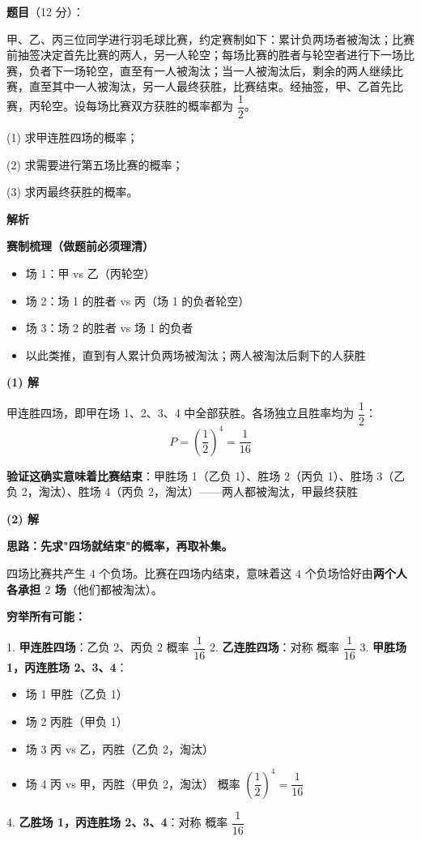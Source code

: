 \begin{answer}

\textbf{题目}（12 分）：

甲、乙、丙三位同学进行羽毛球比赛，约定赛制如下：累计负两场者被淘汰；比赛前抽签决定首先比赛的两人，另一人轮空；每场比赛的胜者与轮空者进行下一场比赛，负者下一场轮空，直至有一人被淘汰；当一人被淘汰后，剩余的两人继续比赛，直至其中一人被淘汰，另一人最终获胜，比赛结束。经抽签，甲、乙首先比赛，丙轮空。设每场比赛双方获胜的概率都为 $\dfrac12$。

  (1) 求甲连胜四场的概率；

  (2) 求需要进行第五场比赛的概率；

  (3) 求丙最终获胜的概率。

\textbf{解析}

\par\medskip

\textbf{赛制梳理（做题前必须理清）}

\begin{itemize}
\item 场 1：甲 vs 乙（丙轮空）
\item 场 2：场 1 的胜者 vs 丙（场 1 的负者轮空）
\item 场 3：场 2 的胜者 vs 场 1 的负者
\item 以此类推，直到有人累计负两场被淘汰；两人被淘汰后剩下的人获胜
\end{itemize}

\par\medskip

\textbf{(1) 解}

甲连胜四场，即甲在场 1、2、3、4 中全部获胜。各场独立且胜率均为 $\dfrac12$：
\nopagebreak[4]
\[P=\left(\frac12\right)^{4}=\frac1{16}\]

\textbf{验证这确实意味着比赛结束}：甲胜场 1（乙负 1）、胜场 2（丙负 1）、胜场 3（乙负 2，淘汰）、胜场 4（丙负 2，淘汰）——两人都被淘汰，甲最终获胜 

\par\medskip

\textbf{(2) 解}

\textbf{思路：先求"四场就结束"的概率，再取补集。}

四场比赛共产生 $4$ 个负场。比赛在四场内结束，意味着这 $4$ 个负场恰好由\textbf{两个人各承担 $2$ 场}（他们都被淘汰）。

\textbf{穷举所有可能：}

1. \textbf{甲连胜四场}：乙负 $2$、丙负 $2$  概率 $\dfrac1{16}$
2. \textbf{乙连胜四场}：对称  概率 $\dfrac1{16}$
3. \textbf{甲胜场 1，丙连胜场 2、3、4}：
\begin{itemize}
\item 场 1 甲胜（乙负 1）
\item 场 2 丙胜（甲负 1）
\item 场 3 丙 vs 乙，丙胜（乙负 2，淘汰）
\item 场 4 丙 vs 甲，丙胜（甲负 2，淘汰） 概率 $\left(\dfrac12\right)^{4}=\dfrac1{16}$
\end{itemize}
4. \textbf{乙胜场 1，丙连胜场 2、3、4}：对称  概率 $\dfrac1{16}$


\end{answer}
